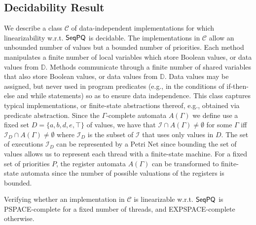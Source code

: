 %



\subsection{Decidability Result}
\label{subsec:combine step-by-step linearizability and co-regular}

We describe a class $\mathcal{C}$ of data-independent implementations for which linearizability w.r.t. $\mathsf{SeqPQ}$ is decidable. The implementations in $\mathcal{C}$ allow an unbounded number of values but a bounded number of priorities. Each method manipulates a finite number of local variables which store Boolean values, or data values from $\mathbb{D}$. Methods communicate through a finite number of shared variables that also store Boolean values, or data values from $\mathbb{D}$. Data values may be assigned, but never used in program predicates (e.g., in the conditions of if-then-else and while statements) so as to ensure data independence. This class captures typical implementations, or finite-state abstractions thereof, e.g., obtained via predicate abstraction. Since the $\Gamma$-complete automata $A(\Gamma)$ we define use a fixed set $D=\{a,b,d,e,\top\}$ of values, we have that $\mathcal{I}\cap A(\Gamma)\neq\emptyset$ for some $\Gamma$ iff $\mathcal{I}_D\cap A(\Gamma)\neq\emptyset$ where $\mathcal{I}_D$ is the subset of $\mathcal{I}$ that uses only values in $D$. The set of executions $\mathcal{I}_D$ can be represented by a Petri Net since bounding the set of values allows us to represent each thread with a finite-state machine. For a fixed set of priorities $P$, the register automata $A(\Gamma)$ can be transformed to finite-state automata since the number of possible valuations of the registers is bounded.

\begin{theorem}
Verifying whether an implementation in $\mathcal{C}$ is linearizable w.r.t. $\mathsf{SeqPQ}$ is PSPACE-complete for a fixed number of threads, and EXPSPACE-complete otherwise.
\end{theorem}

